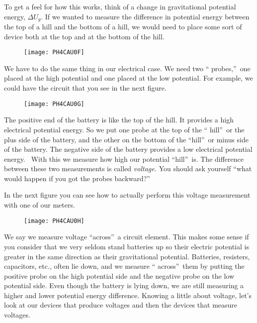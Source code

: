 To get a feel for how this works, think of a change in gravitational
potential energy, $\Delta U_{g}$. If we wanted to measure the difference in
potential energy between the top of a hill and the bottom of a hill, we
would need to place some sort of device both at the top and at the bottom of
the hill. 
\begin{figure}[h!]
	\centering
	\texttt{[image: PH4CAU0F]}
\end{figure}

We have to do the same thing in
our electrical case. We need two \textquotedblleft
probes,\textquotedblright\ one placed at the high potential and one placed
at the low potential. For example, we could have the circuit that you see in
the next figure.

\begin{figure}[h!]
	\centering
	\texttt{[image: PH4CAU0G]}
\end{figure}

The positive end of the battery
is like the top of the hill. It provides a high electrical potential energy.
So we put one probe at the top of the \textquotedblleft
hill\textquotedblright\ or the plus side of the battery, and the other on
the bottom of the \textquotedblleft hill\textquotedblright\ or minus side of
the battery. The negative side of the battery provides a low electrical
potential energy. \emph{\ }With this we measure how high our potential
\textquotedblleft hill\textquotedblright\ is. The difference between these
two measurements is called \emph{voltage. }You should ask yourself
\textquotedblleft what would happen if you got the probes
backward?\textquotedblright\ 

In the next figure you can see how to actually perform this voltage
measurement with one of our meters.

\begin{figure}[h!]
	\centering
    \texttt{[image: PH4CAU0H]}
\end{figure}

We say we measure voltage \textquotedblleft across\textquotedblright\ a
circuit element. This makes some sense if you consider that we very seldom
stand batteries up so their electric potential is greater in the same
direction as their gravitational potential. Batteries, resisters,
capacitors, etc., often lie down, and we measure \textquotedblleft
across\textquotedblright\ them by putting the positive probe on the high
potential side and the negative probe on the low potential side. Even though
the battery is lying down, we are still measuring a higher and lower
potential energy difference. Knowing a little about voltage, let's look at
our devices that produce voltages and then the devices that measure voltages.

